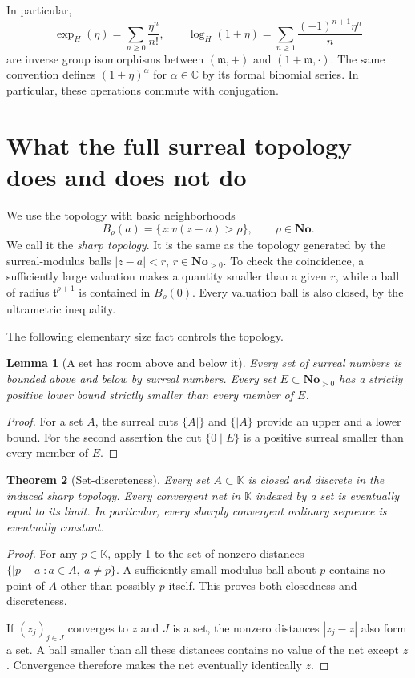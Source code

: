 \documentclass[11pt,a4paper]{article}
\numberwithin{equation}{section}
\newtheorem{theorem}{Theorem}[section]
\newtheorem{lemma}[theorem]{Lemma}
\theoremstyle{definition}
\newcommand{\No}{\mathbf{No}}
\newcommand{\K}{\mathbb K}
\newcommand{\C}{\mathbb C}
\newcommand{\tmon}{\mathfrak t}
\newcommand{\mm}{\mathfrak m}
\begin{document}
In particular,
\begin{equation}\label{eq:small-explog}
 \exp_H(\eta)=\sum_{n\geq0}\frac{\eta^n}{n!},\qquad
 \log_H(1+\eta)=\sum_{n\geq1}\frac{(-1)^{n+1}\eta^n}{n}
\end{equation}
are inverse group isomorphisms between $(\mm,+)$ and $(1+\mm,\cdot)$.
The same convention defines $(1+\eta)^\alpha$ for $\alpha\in\C$ by its formal
binomial series. In particular, these operations commute with conjugation.

\section{What the full surreal topology does and does not do}

We use the topology with basic neighborhoods
\[
 B_\rho(a)=\{z:v(z-a)>\rho\},\qquad\rho\in\No.
\]
We call it the \emph{sharp topology}. It is the same as the topology generated
by the surreal-modulus balls $|z-a|<r$, $r\in\No_{>0}$. To check the
coincidence, a sufficiently large valuation makes a quantity smaller than a
given $r$, while a ball of radius $\tmon^{\rho+1}$ is contained in $B_\rho(0)$.
Every valuation ball is also closed, by the ultrametric inequality.

The following elementary size fact controls the topology.

\begin{lemma}[A set has room above and below it]\label{lem:room}
Every set of surreal numbers is bounded above and below by surreal numbers.
Every set $E\subset\No_{>0}$ has a strictly positive lower bound strictly
smaller than every member of $E$.
\end{lemma}
\begin{proof}
For a set $A$, the surreal cuts $\{A\mid\}$ and $\{\mid A\}$ provide an
upper and a lower bound. For the second assertion the cut $\{0\mid E\}$ is a
positive surreal smaller than every member of $E$.
\end{proof}

\begin{theorem}[Set-discreteness]\label{thm:setdiscrete}
Every set $A\subset\K$ is closed and discrete in the induced sharp topology.
Every convergent net in $\K$ indexed by a set is eventually equal to its limit.
In particular, every sharply convergent ordinary sequence is eventually constant.
\end{theorem}
\begin{proof}
For any $p\in\K$, apply \cref{lem:room} to the set of nonzero distances
$\{|p-a|:a\in A,\ a\neq p\}$. A sufficiently small modulus ball about $p$
contains no point of $A$ other than possibly $p$ itself. This proves both
closedness and discreteness.

If $(z_j)_{j\in J}$ converges to $z$ and $J$ is a set, the nonzero distances
$|z_j-z|$ also form a set. A ball smaller than all these distances contains no
value of the net except $z$. Convergence therefore makes the net eventually
identically $z$.
\end{proof}
\end{document}
